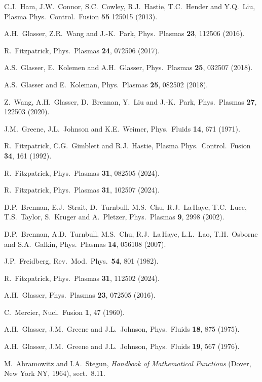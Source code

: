 \documentclass[12pt,prb,aps]{revtex4-1}
\begin{document}
\begin{thebibliography}{99}
 C.J.~Ham, J.W.~Connor, S.C.~Cowley, R.J.~Hastie, T.C.~Hender and Y.Q.~Liu, Plasma Phys.\ Control.\ Fusion {\bf 55} 125015 (2013).

 A.H.~Glasser, Z.R.~Wang and J.-K.~Park, Phys.\ Plasmas {\bf 23}, 112506 (2016).

 R.~Fitzpatrick, Phys.\ Plasmas {\bf 24}, 072506 (2017). 

 A.S.~Glasser, E.~Kolemen and A.H.~Glasser, Phys.\ Plasmas {\bf 25}, 032507 (2018).

 A.S.~Glasser and E.~Koleman, Phys.\ Plasmas {\bf 25}, 082502 (2018). 

 Z.~Wang, A.H.~Glasser, D.~Brennan, Y.~Liu and J.-K.~Park, Phys.\ Plasmas {\bf 27}, 122503 (2020).

 J.M.~Greene, J.L.~Johnson and K.E.~Weimer,  Phys.\  Fluids  {\bf 14}, 671 (1971).

 R.~Fitzpatrick, C.G.~Gimblett and R.J.~Hastie, Plasma Phys.\ Control.\ Fusion {\bf 34}, 161 (1992). 

 R.~Fitzpatrick, Phys.\ Plasmas {\bf 31}, 082505 (2024).

 R.~Fitzpatrick, Phys.\ Plasmas {\bf 31}, 102507 (2024).

 D.P.~Brennan, E.J.~Strait, D.~Turnbull, M.S.~Chu, R.J.~La\,Haye, T.C.~Luce, T.S.~Taylor, S.~Kruger and
A.~Pletzer, Phys.\ Plasmas {\bf 9}, 2998 (2002).

 D.P.~Brennan, A.D.~Turnbull, M.S.~Chu, R.J.~La\,Haye, L.L.~Lao, T.H.~Osborne and S.A.~Galkin, Phys.\ Plasmas {\bf 14}, 056108 (2007). 

 J.P.~Freidberg, Rev.\ Mod.\ Phys.\ {\bf 54},  801 (1982).

 R.~Fitzpatrick, Phys.\ Plasmas {\bf 31}, 112502 (2024).

 A.H.~Glasser, Phys.\ Plasmas {\bf 23}, 072505 (2016).

 C.~Mercier, Nucl.\ Fusion {\bf 1}, 47 (1960).

 A.H.~Glasser, J.M.~Greene and J.L.~Johnson, Phys.\ Fluids {\bf 18}, 875 (1975).

 A.H.~Glasser, J.M.~Greene  and J.L.~Johnson, Phys.\ Fluids {\bf 19}, 567 (1976).

 M.~Abramowitz and I.A.~Stegun, {\em Handbook of Mathematical Functions}\/ (Dover, New York NY, 1964), sect.~8.11.


\end{thebibliography}
\end{document}
